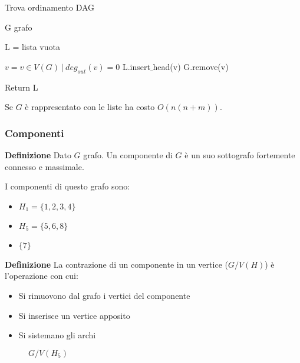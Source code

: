 \documentclass{article}
\begin{document}
\begin{algorithm}[ht]
\caption{Trova ordinamento DAG}
\begin{algorithmic}

\State G grafo
\State

\State L = lista vuota
\State

    \State $v=v\in V(G)\ |\ deg_{out}(v)=0$
    \State L.insert$\_$head(v)
    \State G.remove(v)
\EndWhile

\State
\State Return L

\end{algorithmic}
\end{algorithm}

\noindent Se $G$ è rappresentato con le liste ha costo $O(n(n+m))$.

\subsubsection{Componenti}

\textbf{Definizione} Dato $G$ grafo. Un componente di $G$ è un suo sottografo fortemente connesso e massimale.\newline

\begin{figure}[ht]
    \centering
    
    \label{fig:comp}
\end{figure}

\noindent I componenti di questo grafo sono:
\begin{itemize}
    \item $H_1=\{1,2,3,4\}$
    \item $H_5=\{5,6,8\}$
    \item $\{7\}$\newline
\end{itemize}

\noindent\textbf{Definizione} La contrazione di un componente in un vertice ($G/V(H)$) è l'operazione con cui:
\begin{itemize}
    \item Si rimuovono dal grafo i vertici del componente
    \item Si inserisce un vertice apposito
    \item Si sistemano gli archi\newline
\end{itemize}

\begin{figure}[ht]
    \centering
    
    \label{fig:comp2}
    \caption{$G/V(H_5)$}
\end{figure}
\end{document}
